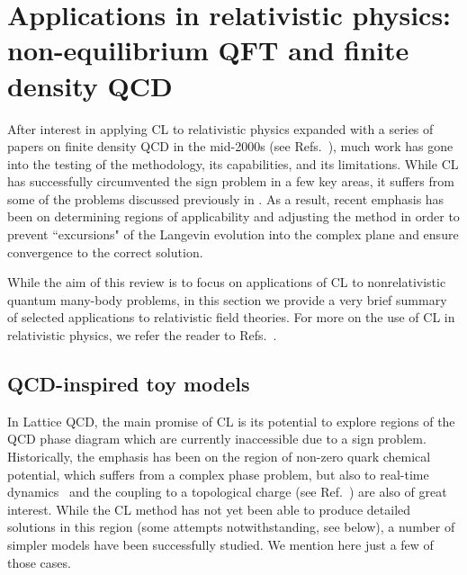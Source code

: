 \documentclass[../main.tex]{subfiles}
\begin{document}
\section{\label{sect:RQFT}Applications in relativistic physics: non-equilibrium QFT and finite density QCD}


After interest in applying CL to relativistic physics expanded with a series of papers on finite
density QCD in the mid-2000s (see Refs.~\cite{PhysRevLett95202003,PhysRevD75045007,JHEP200809018,%
AartsPRL102131601,JHEP200905052,Lattice2012Aarts}),
much work has gone into the testing of the methodology, its capabilities, and its limitations. While CL has
successfully circumvented the sign problem in a few key areas, it suffers from some of the problems discussed
previously in . As a result, recent emphasis has been on determining regions of
applicability and adjusting the method in order to prevent ``excursions" of the Langevin evolution into the
complex plane and ensure convergence to the correct solution.

While the aim of this review is to focus on applications of CL to nonrelativistic quantum many-body problems,
in this section we provide a very brief summary of selected applications to relativistic field theories.
For more on the use of CL in relativistic physics, we refer the reader to Refs.~\cite{Seiler2017StatusOfCL,Lattice2012Aarts}.

\subsection{QCD-inspired toy models}
In Lattice QCD, the main promise of CL is its potential to explore regions of the QCD phase diagram which are currently inaccessible due to a sign
problem. Historically, the emphasis has been on the region of non-zero quark chemical potential, which suffers from a complex phase problem,
but also to real-time dynamics~\cite{Berges:2006xc,Berges:2007nr,deAguiar:2010ue}
and the coupling to a topological charge (see Ref.~\cite{Seiler2017StatusOfCL}) are also of great interest.
While the CL method has not yet been able to produce detailed solutions in this region (some attempts notwithstanding, see below),
 a number of simpler models have been successfully studied. We mention here just a few of those cases.
\end{document}

